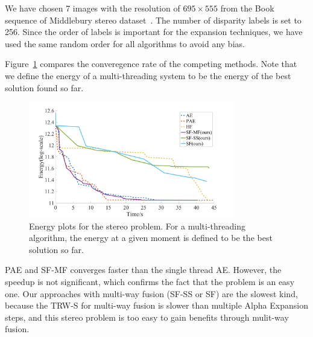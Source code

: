 
\noindent We have chosen 7 images with the resolution of $695\times555$
from the Book sequence of Middlebury stereo
dataset~\cite{middlebury_stereo}. The number of disparity labels is set
to 256.
%
Since the order of labels is important for the expansion techniques,
we have used the same random order for all algorithms to avoid any
bias. 
%

Figure~\ref{fig:stereo_global} compares the converegence rate of the
competing methods. Note that we define the energy of a multi-threading
system to be the energy of the best solution found so far.
%
\begin{figure}[tb]
\centering
\includegraphics[width=0.8\textwidth]{figure/stereo_global.png}
\caption{Energy plots for the stereo problem. For a multi-threading algorithm, the energy at a given moment is
defined to be the best solution so far.}
\label{fig:stereo_global}
\end{figure}
%
PAE and SF-MF converges faster than the single thread AE. However, the
speedup is not significant, which confirms the fact that the problem
is an easy one.
Our approaches with multi-way fusion (SF-SS or SF) are the slowest
kind, because the TRW-S for multi-way fusion is slower than multiple
Alpha Expansion steps, and this stereo problem is too easy to gain
benefits through mulit-way fusion.
%
